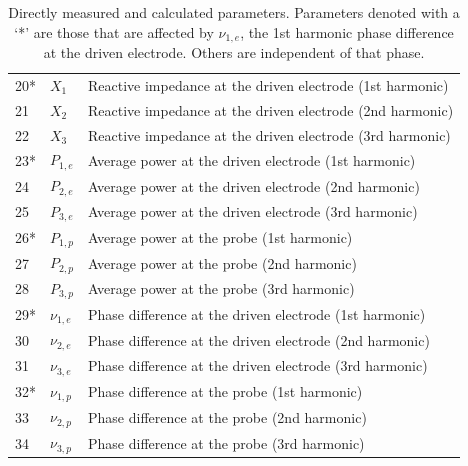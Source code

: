 \documentclass[12pt]{iopart}
\begin{document}
\begin{table}[]
\begin{tabular}{|p{1cm}|p{2cm}|p{12.5cm}|}
       20* & $X_{1}$ & Reactive impedance at the driven electrode (1st harmonic) \\
       21 & $X_{2}$ & Reactive impedance at the driven electrode (2nd harmonic) \\
       22 & $X_{3}$ & Reactive impedance at the driven electrode (3rd harmonic) \\
       23* & $P_{1,e}$ & Average power at the driven electrode (1st harmonic) \\
       24 & $P_{2,e}$ & Average power at the driven electrode (2nd harmonic) \\      
       25 & $P_{3,e}$ & Average power at the driven electrode (3rd harmonic) \\
       26* & $P_{1,p}$ & Average power at the probe (1st harmonic) \\
       27 & $P_{2,p}$ & Average power at the probe (2nd harmonic) \\
       28 & $P_{3,p}$ & Average power at the probe (3rd harmonic) \\
       29* & $\nu_{1,e}$ & Phase difference at the driven electrode (1st harmonic) \\
       30 & $\nu_{2,e}$ & Phase difference at the driven electrode (2nd harmonic) \\
       31 & $\nu_{3,e}$ & Phase difference at the driven electrode (3rd harmonic) \\
       32* & $\nu_{1,p}$ & Phase difference at the probe (1st harmonic) \\
       33 & $\nu_{2,p}$ & Phase difference at the probe (2nd harmonic) \\
       34 & $\nu_{3,p}$ & Phase difference at the probe (3rd harmonic) \\
\hline
    \end{tabular}
    \caption{Directly measured and calculated parameters.  Parameters denoted with a `*' are those that are affected by $\nu_{1,e}$, the 1st harmonic phase difference at the driven electrode.  Others are independent of that phase.}
    \label{tab:Measured_parameters}
\end{table}
\end{document}
